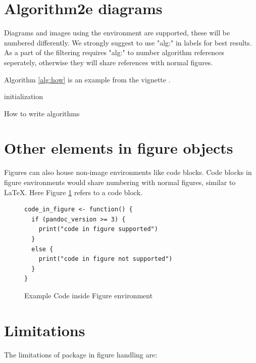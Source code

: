 \section{Algorithm2e diagrams}

Diagrams and images using the  environment are supported, these will be numbered differently.
We strongly suggest to use "alg:" in labels for best results. As a part of the filtering requires "alg:" to number
algorithm references seperately, otherwise they will share references with normal figures.

Algorithm \ref{alg:how} is an example from the  vignette \cite{algoexample}.


\begin{algorithm}[htbp]
\SetAlgoLined
{}
initialization\;
\caption{How to write algorithms}
  \label{alg:how}
\end{algorithm}

\section{Other elements in figure objects}

Figures can also house non-image environments like code blocks. Code blocks 
in figure environments would share numbering with normal figures, similar to LaTeX.
Here Figure \ref{code:example} refers to a code block. 

\begin{figure}[htbp]
\begin{center}
\begin{verbatim}
code_in_figure <- function() {
  if (pandoc_version >= 3) {
    print("code in figure supported")
  }
  else {
    print("code in figure not supported")
  }
}
\end{verbatim}
\caption{ Example Code inside Figure environment}
\label{code:example}
\end{center}
\end{figure}

\section{Limitations}

The limitations of  package in figure handling are:

